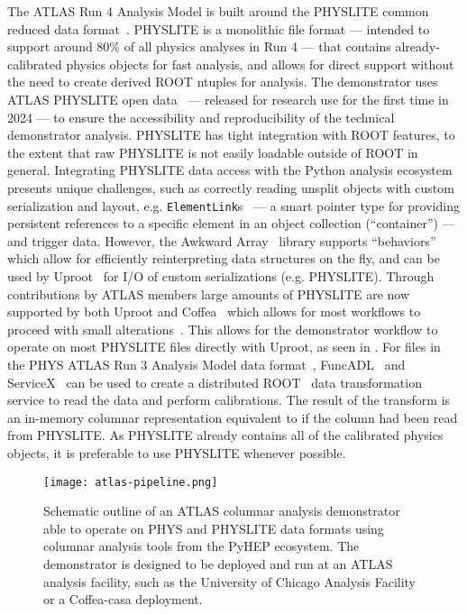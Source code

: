 The ATLAS Run 4 Analysis Model is built around the PHYSLITE common reduced data format~\cite{Schaarschmidt:2024vzr,SOFT-2022-02}.
PHYSLITE is a monolithic file format --- intended to support around 80\% of all physics analyses in Run 4 --- that contains already-calibrated physics objects for fast analysis, and allows for direct support without the need to create derived ROOT ntuples for analysis.
The demonstrator uses ATLAS PHYSLITE open data~\cite{ATL-OREACH-PROC-2024-005} --- released for research use for the first time in 2024 --- to ensure the accessibility and reproducibility of the technical demonstrator analysis.
PHYSLITE has tight integration with ROOT features, to the extent that raw PHYSLITE is not easily loadable outside of ROOT in general.
Integrating PHYSLITE data access with the Python analysis ecosystem presents unique challenges, such as correctly reading unsplit objects with custom serialization and layout, e.g. \texttt{ElementLink}s~\cite{Hartmann:2021qzp} --- a smart pointer type for providing persistent references to a specific element in an object collection (``container'') --- and trigger data.
However, the Awkward Array~\cite{Awkward_Array_2018} library supports ``behaviors'' which allow for efficiently reinterpreting data structures on the fly, and can be used by Uproot~\cite{Uproot_2017} for I/O of custom serializations (e.g. PHYSLITE).
Through contributions by ATLAS members large amounts of PHYSLITE are now supported by both Uproot and Coffea~\cite{Coffea_2023,CMS:2020kpn} which allows for most workflows to proceed with small alterations~\cite{US_ATLAS_IRISHEP_trainging:2024}.
This allows for the demonstrator workflow to operate on most PHYSLITE files directly with Uproot, as seen in .
For files in the PHYS ATLAS Run 3 Analysis Model data format~\cite{SOFT-2022-02}, FuncADL~\cite{funcadl_2024,Proffitt:2021wfh} and ServiceX~\cite{serviceX_2024,serviceX_client_2024,Galewsky:2020xig} can be used to create a distributed ROOT~\cite{Brun:1997pa} data transformation service to read the data and perform calibrations.
The result of the transform is an in-memory columnar representation equivalent to if the column had been read from PHYSLITE.
As PHYSLITE already contains all of the calibrated physics objects, it is preferable to use PHYSLITE whenever possible.

\begin{figure}
    \centering
    \texttt{[image: atlas-pipeline.png]}
    \caption{Schematic outline of an ATLAS columnar analysis demonstrator able to operate on PHYS and PHYSLITE data formats using columnar analysis tools from the PyHEP ecosystem.
    The demonstrator is designed to be deployed and run at an ATLAS analysis facility, such as the University of Chicago Analysis Facility or a Coffea-casa deployment.}
    \label{fig:atlas-pipeline}
\end{figure}
